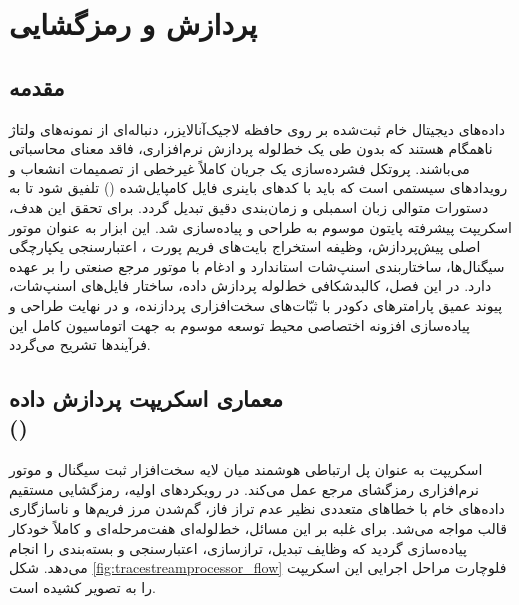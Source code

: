 
\chapter{پردازش و رمزگشایی }
\label{ch:decoding}

\section{مقدمه}
داده‌های دیجیتال خام ثبت‌شده بر روی حافظه لاجیک‌آنالایزر، دنباله‌ای از نمونه‌های ولتاژ ناهمگام هستند که بدون طی یک خط‌لوله پردازش نرم‌افزاری، فاقد معنای محاسباتی می‌باشند. پروتکل فشرده‌سازی  یک جریان کاملاً غیرخطی از تصمیمات انشعاب و رویدادهای سیستمی است که باید با کدهای باینری فایل کامپایل‌شده () تلفیق شود تا به دستورات متوالی زبان اسمبلی و زمان‌بندی دقیق تبدیل گردد. برای تحقق این هدف، اسکریپت پیشرفته پایتون موسوم به  طراحی و پیاده‌سازی شد. این ابزار به عنوان موتور اصلی پیش‌پردازش، وظیفه استخراج بایت‌های فریم پورت ، اعتبارسنجی یکپارچگی سیگنال‌ها، ساختاربندی اسنپ‌شات استاندارد و ادغام با موتور مرجع صنعتی  را بر عهده دارد. در این فصل، کالبدشکافی خط‌لوله پردازش داده، ساختار فایل‌های اسنپ‌شات، پیوند عمیق پارامترهای دکودر با ثبّات‌های سخت‌افزاری پردازنده، و در نهایت طراحی و پیاده‌سازی افزونه اختصاصی محیط توسعه  موسوم به  جهت اتوماسیون کامل این فرآیندها تشریح می‌گردد.

\section[معماری اسکریپت پردازش داده \lr{TraceStreamProcessor.py}]{معماری اسکریپت پردازش داده\\ ()}
\label{sec:tracestreamprocessor_arch}
اسکریپت  به عنوان پل ارتباطی هوشمند میان لایه سخت‌افزار ثبت سیگنال و موتور نرم‌افزاری رمزگشای مرجع  عمل می‌کند. در رویکردهای اولیه، رمزگشایی مستقیم داده‌های خام با خطاهای متعددی نظیر عدم تراز فاز، گم‌شدن مرز فریم‌ها و ناسازگاری قالب مواجه می‌شد. برای غلبه بر این مسائل، خط‌لوله‌ای هفت‌مرحله‌ای و کاملاً خودکار پیاده‌سازی گردید که وظایف تبدیل، ترازسازی، اعتبارسنجی و بسته‌بندی را انجام می‌دهد. شکل \ref{fig:tracestreamprocessor_flow} فلوچارت مراحل اجرایی این اسکریپت را به تصویر کشیده است.

